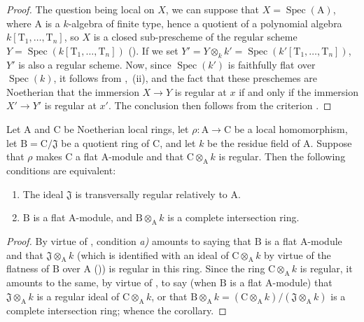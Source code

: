 \begin{proof}
The question being local on $X$, we can suppose that $X=\operatorname{Spec}(\mathrm{A})$, where $\mathrm{A}$ is a $k$-algebra of finite type, hence a quotient of a polynomial algebra $k[\mathrm{T}_1,\ldots,\mathrm{T}_n]$, so $X$ is a closed sub-prescheme of the regular scheme $Y=\operatorname{Spec}(k[\mathrm{T}_1,\ldots,\mathrm{T}_n])$ ().
If we set $Y'=Y\otimes_k k'=\operatorname{Spec}(k'[\mathrm{T}_1,\ldots,\mathrm{T}_n])$, $Y'$ is also a regular scheme.
Now, since $\operatorname{Spec}(k')$ is faithfully flat over $\operatorname{Spec}(k)$, it follows from ,~(ii), and the fact that these preschemes are Noetherian that the immersion $X\to Y$ is regular at $x$ if and only if the immersion $X'\to Y'$ is regular at $x'$.
The conclusion then follows from the criterion .
\end{proof}

\begin{corollary}[19.3.5]
\label{IV.19.3.5}
Let $\mathrm{A}$ and $\mathrm{C}$ be Noetherian local rings, let $\rho:\mathrm{A}\to\mathrm{C}$ be a local homomorphism, let $\mathrm{B}=\mathrm{C}/\mathfrak{J}$ be a quotient ring of $\mathrm{C}$, and let $k$ be the residue field of $\mathrm{A}$.
Suppose that $\rho$ makes $\mathrm{C}$ a flat $\mathrm{A}$-module and that $\mathrm{C}\otimes_{\mathrm{A}}k$ is regular.
Then the following conditions are equivalent:
\begin{enumerate}[label=\emph{\alph*)}]
  \item The ideal $\mathfrak{J}$ is transversally regular relatively to $\mathrm{A}$.
  \item $\mathrm{B}$ is a flat $\mathrm{A}$-module, and $\mathrm{B}\otimes_{\mathrm{A}} k$ is a complete intersection ring.
\end{enumerate}
\end{corollary}

\begin{proof}
By virtue of , condition \emph{a)} amounts to saying that $\mathrm{B}$ is a flat $\mathrm{A}$-module and that $\mathfrak{J}\otimes_{\mathrm{A}} k$ (which is identified with an ideal of $\mathrm{C}\otimes_{\mathrm{A}} k$ by virtue of the flatness of $\mathrm{B}$ over $\mathrm{A}$ ()) is regular in this ring.
Since the ring $\mathrm{C}\otimes_{\mathrm{A}} k$ is regular, it amounts to the same, by virtue of , to say (when $\mathrm{B}$ is a flat $\mathrm{A}$-module) that $\mathfrak{J}\otimes_{\mathrm{A}} k$ is a regular ideal of $\mathrm{C}\otimes_{\mathrm{A}} k$, or that $\mathrm{B}\otimes_{\mathrm{A}} k=(\mathrm{C}\otimes_{\mathrm{A}} k)/(\mathfrak{J}\otimes_{\mathrm{A}} k)$ is a complete intersection ring; whence the corollary.
\end{proof}

